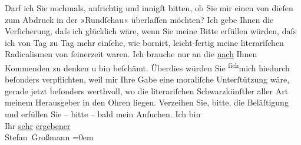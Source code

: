 \begin{ledgroupsized}[t]{13cm}
           \pstart
           Darf ich Sie nochmals, aufrichtig und innigſt bitten, ob Sie mir einen von dieſen zum
               Abdruck in der »Rundſchau« überlaſſen möchten? Ich
               gebe Ihnen die Verſicherung, daſs ich glücklich wäre, wenn Sie meine Bitte erfüllen
               würden, daſs ich von Tag zu Tag \strikeout{\textcolor{gray}{×}\-\textcolor{gray}{×}} mehr einſehe, wie bornirt, leicht-fertig meine  literariſchen Radicalismen von ſeinerzeit waren.
               Ich brauche nur an die \uline{nach} Ihnen Kommenden zu denken
               u bin beſchämt.\pend
           \pstart
           Überdies würden Sie \substVorne{}\textsuperscript{ſich}\substDazwischen{}mich\substHinten{} hiedurch beſonders verpflichten, weil mir Ihre Gabe eine moraliſche Unter{\pb}ſtützung wäre, gerade jetzt beſonders
               werthvoll, wo die literariſchen Schwarzkünſtler aller Art meinem Herausgeber in den
               Ohren liegen.\pend
           \pstart
           Verzeihen Sie, bitte, die Beläſtigung und erfüllen Sie – bitte – bald mein
               Anſuchen.\pend
           \pstart
           Ich bin{\\[\baselineskip]} Ihr \uline{sehr}{ }\uline{ergebener}{\\[\baselineskip]}\spacefill\mbox{Stefan Großmann}\pend
           \leftskip=0em{}\endnumbering{}\end{ledgroupsized}  \newcommand{\dateiname}{L00847}\newcommand{\titel}{Stefan Großmann an Arthur Schnitzler, 16. 9. 1898}\newcommand{\editorInnen}{ Martin Anton Müller und Gerd-Hermann Susen}
      